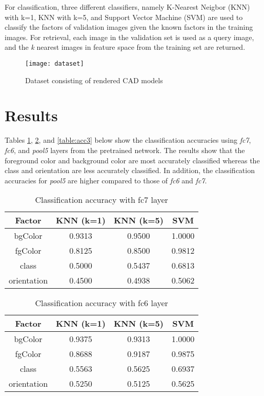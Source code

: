\documentclass[twoside,10pt]{article}
\newcommand{\imsize}{0.9\linewidth}
\begin{document}
For classification, three different classifiers, namely K-Nearest Neigbor (KNN) with k=1, KNN with k=5, and Support Vector Machine (SVM) are used to
classify the factors of validation images given the known factors in the training images. For retrieval, each image in the validation set is used as 
a query image, and the \textit{k} nearest images in feature space from the training set are returned.

\begin{figure}[h!]
\centering
\texttt{[image: dataset]}
\caption{Dataset consisting of rendered CAD models \label{fig:dataset}}
\end{figure}

\section{Results}

Tables \ref{table:acc1}, \ref{table:acc2}, and \ref{table:acc3} below show the classification accuracies using \textit{fc7}, \textit{fc6}, and \textit{pool5} layers 
from the pretrained network. The results show that the foreground color and background color are most accurately classified whereas the class and orientation
are less accurately classified. In addition, the classification accuracies for \textit{pool5} are higher compared to those of \textit{fc6} and \textit{fc7}.

\begin{table}[h!]
\centering
\begin{tabular}{c|ccc}
Factor & KNN (k=1) & KNN (k=5) & SVM\\
\hline
bgColor & 0.9313 & 0.9500 & 1.0000\\
fgColor & 0.8125 & 0.8500 & 0.9812\\
class & 0.5000 & 0.5437 & 0.6813\\
orientation & 0.4500 & 0.4938 & 0.5062\\
\end{tabular}
\caption{Classification accuracy with fc7 layer\label{table:acc1}}
\end{table}

\begin{table}[h!]
\centering
\begin{tabular}{c|ccc}
Factor & KNN (k=1) & KNN (k=5) & SVM\\
\hline
bgColor & 0.9375 & 0.9313 & 1.0000\\
fgColor & 0.8688 & 0.9187 & 0.9875\\
class & 0.5563 & 0.5625 & 0.6937\\
orientation & 0.5250 & 0.5125 & 0.5625\\
\end{tabular}
\caption{Classification accuracy with fc6 layer\label{table:acc2}}
\end{table}
\end{document}
